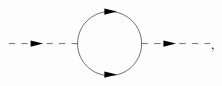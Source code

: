 \begin{equation}
\begin{gathered}
\begin{tikzpicture}[x=0.75pt,y=0.75pt,yscale=-1,xscale=1]
            \draw  [dash pattern={on 4.5pt off 4.5pt}]  (100,125) -- (165.71,125) ;
            \draw [shift={(132.85,125)}, rotate = 180] [fill={rgb, 255:red, 0; green, 0; blue, 0 }  ][line width=0.08]  [draw opacity=0] (12,-3) -- (0,0) -- (12,3) -- cycle    ;
            \draw   (165.71,125) .. controls (165.71,108.1) and (179.41,94.4) .. (196.31,94.4) .. controls (213.21,94.4) and (226.91,108.1) .. (226.91,125) .. controls (226.91,141.9) and (213.21,155.6) .. (196.31,155.6) .. controls (179.41,155.6) and (165.71,141.9) .. (165.71,125) -- cycle ;
            \draw  [dash pattern={on 4.5pt off 4.5pt}]  (226.91,125) -- (292.62,125) ;
            \draw [shift={(259.76,125)}, rotate = 180] [fill={rgb, 255:red, 0; green, 0; blue, 0 }  ][line width=0.08]  [draw opacity=0] (12,-3) -- (0,0) -- (12,3) -- cycle    ;
            \draw    (203.31,94.4) ;
            \draw [shift={(203.31,94.4)}, rotate = 180] [fill={rgb, 255:red, 0; green, 0; blue, 0 }  ][line width=0.08]  [draw opacity=0] (12,-3) -- (0,0) -- (12,3) -- cycle    ;
            \draw    (203.31,154.6) ;
            \draw [shift={(203.31,154.6)}, rotate = 180] [fill={rgb, 255:red, 0; green, 0; blue, 0 }  ][line width=0.08]  [draw opacity=0] (12,-3) -- (0,0) -- (12,3) -- cycle    ;
            \end{tikzpicture}                  
    \end{gathered},
    \label{eq:bcs-cooper-2nd-propagator}
\end{equation}